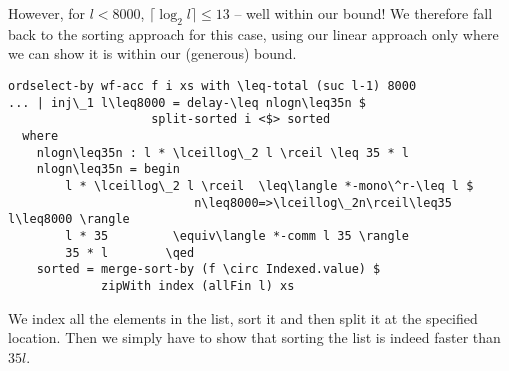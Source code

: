 However, for $l < 8000$, $\lceil \log_2 l \rceil \leq 13$ -- well within our bound! We therefore fall back to the sorting approach for this case, using our linear approach only where we can show it is within our (generous) bound.

\begin{lstlisting}[caption={Quickselect ($l \leq 8000$)},label={lst:median:quickselect:small},emph={ordselect,by,split,sorted,merge,sort}]
ordselect-by wf-acc f i xs with \leq-total (suc l-1) 8000
... | inj\_1 l\leq8000 = delay-\leq nlogn\leq35n $
                    split-sorted i <$> sorted
  where
    nlogn\leq35n : l * \lceillog\_2 l \rceil \leq 35 * l
    nlogn\leq35n = begin
        l * \lceillog\_2 l \rceil  \leq\langle *-mono\^r-\leq l $
                          n\leq8000=>\lceillog\_2n\rceil\leq35 l\leq8000 \rangle
        l * 35         \equiv\langle *-comm l 35 \rangle
        35 * l        \qed
    sorted = merge-sort-by (f \circ Indexed.value) $
             zipWith index (allFin l) xs
\end{lstlisting}

We index all the elements in the list, sort it and then split it at the specified location. Then we simply have to show that sorting the list is indeed faster than $35l$.

